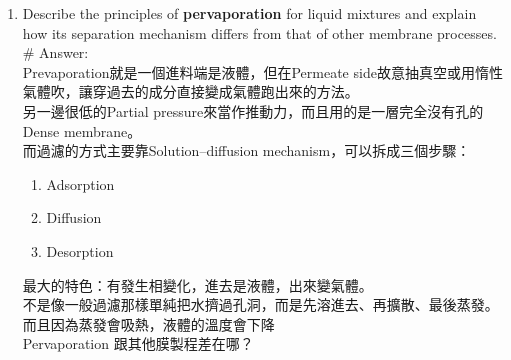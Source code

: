 ﻿\documentclass[12pt,a4paper]{article}
\begin{document}
\begin{problems}
\begin{enumerate}
\# Answer:
\begin{itemize}
  \item Reverse osmosis:
  \begin{itemize}
    \item Separation size range:\\
    能擋下極小的東西 $<1$ nm, 通常分子量 $<100$ Da
    \item Driving force：20 到 80 bar
    \item Typical applications:\\
    海水淡化、工業鍋爐給水、還有半導體在用的超純水製造
  \end{itemize}
  \item Ultrafiltration:
  \begin{itemize}
  \item Separation size range:\\
  colloids, proteins, macromolecules (about 1--100 nm, typically 1--500 kDa MWCO)
  \item Driving force: 1 到 10 bar
  \item Typical applicaion:\\
  濃縮蛋白質、Wastewater clarification，或是當作進去RO系統前的前處理，先幫RO擋下大顆粒免得它阻塞
  \end{itemize}
\end{itemize}
\item Describe the principles of \textbf{pervaporation} for liquid mixtures and explain how its separation mechanism differs from that of other membrane processes.\\
\# Answer:\\
Prevaporation就是一個進料端是液體，但在Permeate side故意抽真空或用惰性氣體吹，讓穿過去的成分直接變成氣體跑出來的方法。\\
另一邊很低的Partial pressure來當作推動力，而且用的是一層完全沒有孔的 Dense membrane。\\
而過濾的方式主要靠Solution–diffusion mechanism，可以拆成三個步驟：
\begin{enumerate}
\item Adsorption
\item Diffusion
\item Desorption
\end{enumerate}
最大的特色：有發生相變化，進去是液體，出來變氣體。\\
不是像一般過濾那樣單純把水擠過孔洞，而是先溶進去、再擴散、最後蒸發。\\
而且因為蒸發會吸熱，液體的溫度會下降\\
Pervaporation 跟其他膜製程差在哪？\\

\end{enumerate}
\end{problems}
\end{document}
